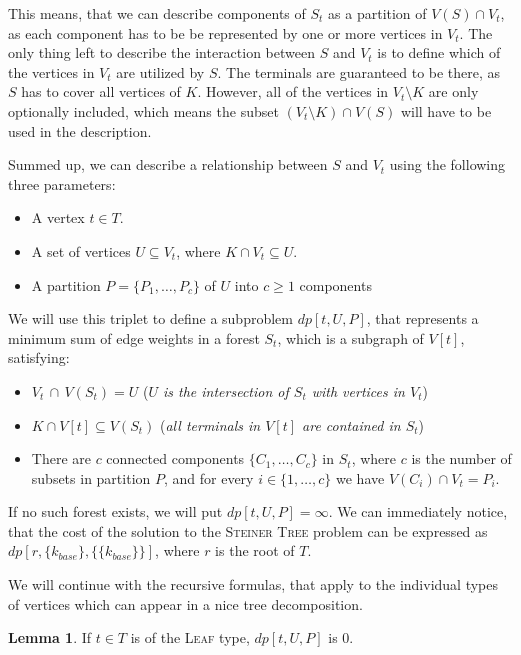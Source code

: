 \documentclass[thesis=M,english,hidelinks]{FITthesis}[2012/10/20]
\theoremstyle{definition}
\newtheorem{lemma}{Lemma}
\begin{document}
This means, that we can describe components of $S_t$ as a partition of $V(S) \cap V_t$, as each component has
to be be represented by one or more vertices in $V_t$. The only thing left to describe the interaction between $S$ and $V_t$ is
to define which of the vertices in $V_t$ are utilized by $S$. The terminals are guaranteed to be there, as $S$ has to
cover all vertices of $K$. However, all of the vertices in $V_t \setminus K$ are only optionally included, which means
the subset $(V_t \setminus K) \cap V(S)$ will have to be used in the description.

Summed up, we can describe a relationship between $S$ and $V_t$ using the following three parameters:
\begin{itemize}
    \item A vertex $t \in T$.
    \item A set of vertices $U \subseteq V_t$, where $K \cap V_t \subseteq U$.
    \item A partition $P = \{P_1, \ldots, P_c\}$ of $U$ into $c \geq 1$ components
\end{itemize}

We will use this triplet to define a subproblem $dp[t, U, P]$, that represents a minimum sum of edge weights
in a forest $S_t$, which is a subgraph of $V[t]$, satisfying:

\begin{itemize}
    \item $V_t\,\cap\,V(S_t) = U$ (\emph{$U$ is the intersection of $S_t$ with vertices in $V_t$})
    \item $K \cap V[t] \subseteq V(S_t)$ (\emph{all terminals in $V[t]$ are contained in $S_t$})
    \item There are $c$ connected components $\{C_1, \ldots, C_c\}$ in $S_t$, where $c$ is the number of subsets in
        partition $P$, and for every $i \in \{1, \ldots, c\}$ we have $V(C_i) \cap V_t = P_i$.
\end{itemize}

If no such forest exists, we will put $dp[t, U, P] = \infty$. We can immediately notice, that the cost of the
solution to the \textsc{Steiner Tree} problem can be expressed as $dp[r, \{k_{base}\}, \{\{k_{base}\}\}]$, where $r$ is
the root of $T$.

We will continue with the recursive formulas, that apply to the individual types of vertices which can appear in a
nice tree decomposition.

\begin{lemma}
    If $t \in T$ is of the \textsc{Leaf} type, $dp[t, U, P]$ is 0.
\end{lemma}
\end{document}
